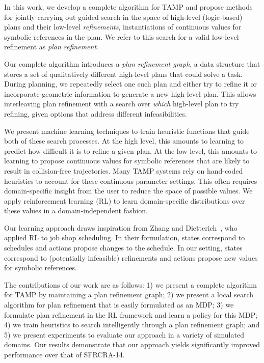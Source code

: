 In this work, we develop a complete algorithm for TAMP and propose
methods for jointly carrying out guided search in the space of
high-level (logic-based) plans and their low-level
\emph{refinements}, instantiations of continuous values for
symbolic references in the plan. We refer to this search for a valid low-level
refinement as \emph{plan refinement}.

Our complete algorithm introduces
a \emph{plan refinement graph}, a data structure that stores a
set of qualitatively different high-level plans that could solve a task.
During planning, we repeatedly select one such plan and either try to
refine it or incorporate geometric information to generate a new high-level
plan. This allows interleaving plan refinement with a
search over \emph{which} high-level plan to try refining, given options
that address different infeasibilities.

We present machine learning techniques to train heuristic functions that guide
both of these search processes. At the high level, this amounts to learning
to predict how difficult it is to refine a given plan. At the low level, this amounts to
learning to propose continuous values for symbolic references that are likely to result in
collision-free trajectories. Many TAMP systems rely on hand-coded heuristics to
account for these continuous parameter settings. This often requires
domain-specific insight from the user to reduce the space of possible values.
We apply reinforcement learning (RL) to learn domain-specific distributions
over these values in a domain-independent fashion.

Our learning approach draws inspiration
from Zhang and Dietterich~\cite{JobShopSched}, who applied RL to job
shop scheduling. In their formulation, states correspond to schedules
and actions propose changes to the schedule. In our setting, states
correspond to (potentially infeasible) refinements and actions propose
new values for symbolic references.

The contributions of our work are as follows: 1) we present a complete
algorithm for TAMP by maintaining a plan refinement graph; 2) we
present a local search algorithm for plan refinement that is easily
formulated as an MDP; 3) we formulate plan refinement in the RL
framework and learn a policy for this MDP; 4) we train heuristics to
search intelligently through a plan refinement graph; and 5) we
present experiments to evaluate our approach in a variety of simulated
domains. Our results demonstrate that our approach yields
significantly improved performance over that of SFRCRA-14.
